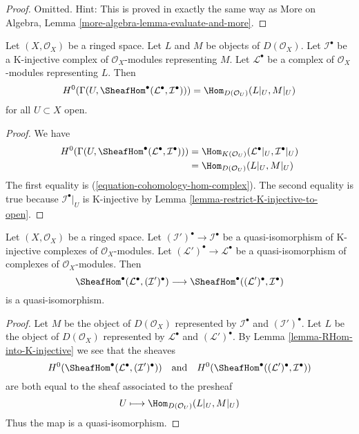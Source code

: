 \begin{proof}
Omitted. Hint: This is proved in exactly the same way as
More on Algebra, Lemma \ref{more-algebra-lemma-evaluate-and-more}.
\end{proof}

\begin{lemma}
\label{lemma-RHom-into-K-injective}
Let $(X, \mathcal{O}_X)$ be a ringed space. Let $L$ and $M$
be objects of $D(\mathcal{O}_X)$. Let $\mathcal{I}^\bullet$
be a K-injective complex of $\mathcal{O}_X$-modules representing $M$. Let
$\mathcal{L}^\bullet$ be a complex of $\mathcal{O}_X$-modules
representing $L$. Then
$$
H^0(\Gamma(U, \SheafHom^\bullet(\mathcal{L}^\bullet, \mathcal{I}^\bullet))) =
\Hom_{D(\mathcal{O}_U)}(L|_U, M|_U)
$$
for all $U \subset X$ open.
\end{lemma}

\begin{proof}
We have
\begin{align*}
H^0(\Gamma(U, \SheafHom^\bullet(\mathcal{L}^\bullet, \mathcal{I}^\bullet)))
& =
\Hom_{K(\mathcal{O}_U)}(\mathcal{L}^\bullet|_U, \mathcal{I}^\bullet|_U) \\
& =
\Hom_{D(\mathcal{O}_U)}(L|_U, M|_U)
\end{align*}
The first equality is (\ref{equation-cohomology-hom-complex}).
The second equality is true because $\mathcal{I}^\bullet|_U$
is K-injective by Lemma \ref{lemma-restrict-K-injective-to-open}.
\end{proof}

\begin{lemma}
\label{lemma-RHom-well-defined}
Let $(X, \mathcal{O}_X)$ be a ringed space. Let
$(\mathcal{I}')^\bullet \to \mathcal{I}^\bullet$
be a quasi-isomorphism of K-injective complexes of $\mathcal{O}_X$-modules.
Let $(\mathcal{L}')^\bullet \to \mathcal{L}^\bullet$
be a quasi-isomorphism of complexes of $\mathcal{O}_X$-modules.
Then
$$
\SheafHom^\bullet(\mathcal{L}^\bullet, (\mathcal{I}')^\bullet)
\longrightarrow
\SheafHom^\bullet((\mathcal{L}')^\bullet, \mathcal{I}^\bullet)
$$
is a quasi-isomorphism.
\end{lemma}

\begin{proof}
Let $M$ be the object of $D(\mathcal{O}_X)$ represented by
$\mathcal{I}^\bullet$ and $(\mathcal{I}')^\bullet$.
Let $L$ be the object of $D(\mathcal{O}_X)$ represented by
$\mathcal{L}^\bullet$ and $(\mathcal{L}')^\bullet$.
By Lemma \ref{lemma-RHom-into-K-injective}
we see that the sheaves
$$
H^0(\SheafHom^\bullet(\mathcal{L}^\bullet, (\mathcal{I}')^\bullet))
\quad\text{and}\quad
H^0(\SheafHom^\bullet((\mathcal{L}')^\bullet, \mathcal{I}^\bullet))
$$
are both equal to the sheaf associated to the presheaf
$$
U \longmapsto \Hom_{D(\mathcal{O}_U)}(L|_U, M|_U)
$$
Thus the map is a quasi-isomorphism.
\end{proof}

